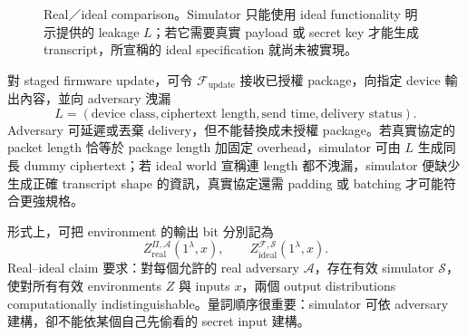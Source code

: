 \documentclass[11pt,a4paper,oneside,openany]{book}
\begin{document}
\begin{figure}[htbp]
\centering
{}
\caption{Real／ideal comparison。Simulator 只能使用 ideal functionality 明示提供的 leakage $L$；若它需要真實 payload 或 secret key 才能生成 transcript，所宣稱的 ideal specification 就尚未被實現。}
\label{fig:real-ideal-worlds}
\end{figure}

對 staged firmware update，可令 $\mathcal F_{\mathrm{update}}$ 接收已授權 package，向指定 device 輸出內容，並向 adversary 洩漏
\[
 L=(\text{device class},\text{ciphertext length},\text{send time},\text{delivery status}).
\]
Adversary 可延遲或丟棄 delivery，但不能替換成未授權 package。若真實協定的 packet length 恰等於 package length 加固定 overhead，simulator 可由 $L$ 生成同長 dummy ciphertext；若 ideal world 宣稱連 length 都不洩漏，simulator 便缺少生成正確 transcript shape 的資訊，真實協定還需 padding 或 batching 才可能符合更強規格。

形式上，可把 environment 的輸出 bit 分別記為
\[
 Z_{\mathrm{real}}^{\Pi,\mathcal A}(1^\lambda,x),
 \qquad
 Z_{\mathrm{ideal}}^{\mathcal F,\mathcal S}(1^\lambda,x).
\]
Real--ideal claim 要求：對每個允許的 real adversary $\mathcal A$，存在有效 simulator $\mathcal S$，使對所有有效 environments $Z$ 與 inputs $x$，兩個 output distributions computationally indistinguishable。量詞順序很重要：simulator 可依 adversary 建構，卻不能依某個自己先偷看的 secret input 建構。
\end{document}
